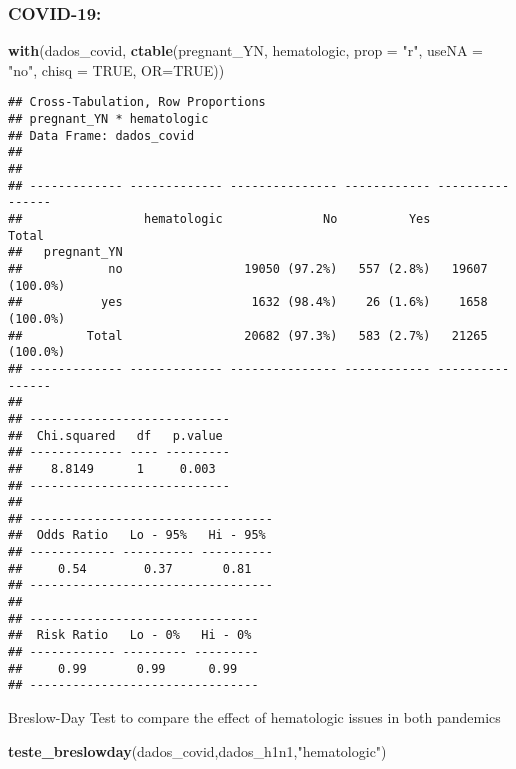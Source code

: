 \documentclass[
]{article}
\newenvironment{Shaded}{\begin{snugshade}}{\end{snugshade}}
\newcommand{\DataTypeTok}[1]{\textcolor[rgb]{0.13,0.29,0.53}{#1}}
\newcommand{\KeywordTok}[1]{\textcolor[rgb]{0.13,0.29,0.53}{\textbf{#1}}}
\newcommand{\NormalTok}[1]{#1}
\newcommand{\OtherTok}[1]{\textcolor[rgb]{0.56,0.35,0.01}{#1}}
\newcommand{\StringTok}[1]{\textcolor[rgb]{0.31,0.60,0.02}{#1}}
\begin{document}
\hypertarget{covid-19-9}{%
\subsubsection{COVID-19:}\label{covid-19-9}}

\begin{Shaded}
\begin{Highlighting}[]
\KeywordTok{with}\NormalTok{(dados_covid, }\KeywordTok{ctable}\NormalTok{(pregnant_YN, hematologic, }\DataTypeTok{prop =} \StringTok{"r"}\NormalTok{, }\DataTypeTok{useNA =} \StringTok{"no"}\NormalTok{, }\DataTypeTok{chisq =} \OtherTok{TRUE}\NormalTok{, }\DataTypeTok{OR=}\OtherTok{TRUE}\NormalTok{))}
\end{Highlighting}
\end{Shaded}

\begin{verbatim}
## Cross-Tabulation, Row Proportions  
## pregnant_YN * hematologic  
## Data Frame: dados_covid  
## 
## 
## ------------- ------------- --------------- ------------ ----------------
##                 hematologic              No          Yes            Total
##   pregnant_YN                                                            
##            no                 19050 (97.2%)   557 (2.8%)   19607 (100.0%)
##           yes                  1632 (98.4%)    26 (1.6%)    1658 (100.0%)
##         Total                 20682 (97.3%)   583 (2.7%)   21265 (100.0%)
## ------------- ------------- --------------- ------------ ----------------
## 
## ----------------------------
##  Chi.squared   df   p.value 
## ------------- ---- ---------
##    8.8149      1     0.003  
## ----------------------------
## 
## ----------------------------------
##  Odds Ratio   Lo - 95%   Hi - 95% 
## ------------ ---------- ----------
##     0.54        0.37       0.81   
## ----------------------------------
## 
## --------------------------------
##  Risk Ratio   Lo - 0%   Hi - 0% 
## ------------ --------- ---------
##     0.99       0.99      0.99   
## --------------------------------
\end{verbatim}

Breslow-Day Test to compare the effect of hematologic issues in both
pandemics

\begin{Shaded}
\begin{Highlighting}[]
\KeywordTok{teste_breslowday}\NormalTok{(dados_covid,dados_h1n1,}\StringTok{"hematologic"}\NormalTok{)}
\end{Highlighting}
\end{Shaded}
\end{document}
